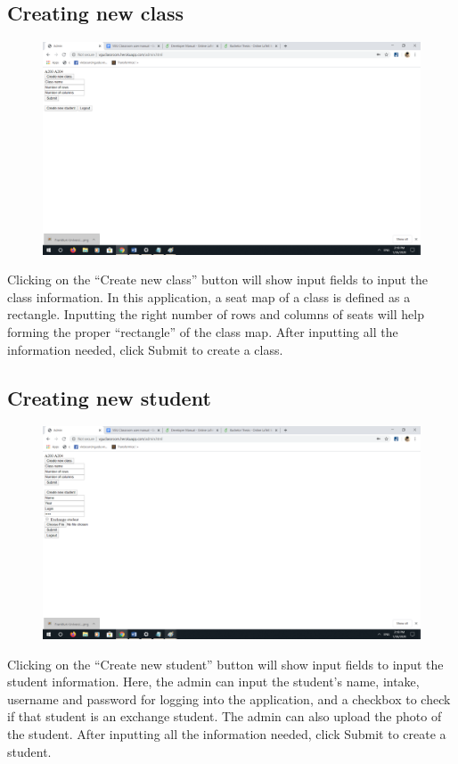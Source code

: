 \documentclass[a4paper, 11pt,openany]{book} %
\begin{document}
\subsection{Creating new class}
\begin{figure}[H]
    \centering
    \includegraphics[width=\textwidth,height=\textheight,keepaspectratio]{images/3.png}
\end{figure}
Clicking on the “Create new class” button will show input fields to input the class information. In this application, a seat map of a class is defined as a rectangle. Inputting the right number of rows and columns of seats will help forming the proper “rectangle” of the class map. After inputting all the information needed, click Submit to create a class.
\subsection{Creating new student}
\begin{figure}[H]
    \centering
    \includegraphics[width=\textwidth,height=\textheight,keepaspectratio]{images/4.png}
\end{figure}
Clicking on the “Create new student” button will show input fields to input the student information. Here, the admin can input the student’s name, intake, username and password for logging into the application, and  a checkbox to check if that student is an exchange student. The admin can also upload the photo of the student. After inputting all the information needed, click Submit to create a student.
\end{document}
